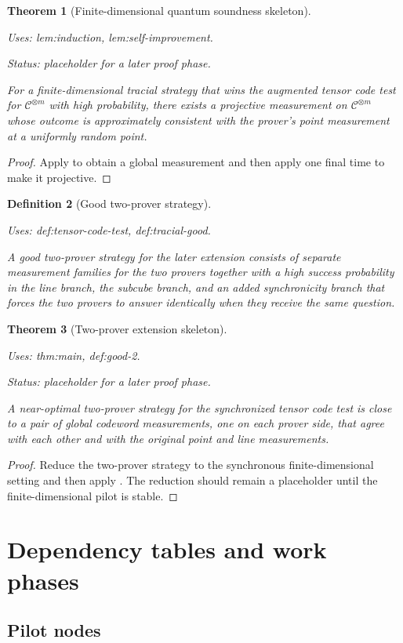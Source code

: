 \documentclass{article}
\providecommand{\uses}[1]{\par\smallskip\noindent\emph{Uses:} #1.\par\smallskip}
\providecommand{\notready}{\par\smallskip\noindent\emph{Status: placeholder for a later proof phase.}\par\smallskip}
\newtheorem{definition}{Definition}[section]
\newtheorem{theorem}[definition]{Theorem}
\theoremstyle{remark}
\newcommand{\code}{\mathcal{C}}
\begin{document}
\begin{theorem}[Finite-dimensional quantum soundness skeleton]\label{thm:main}
  \uses{lem:induction, lem:self-improvement}
  \notready
  For a finite-dimensional tracial strategy that wins the augmented tensor code test for $\code^{\otimes m}$ with high probability, there exists a projective measurement on $\code^{\otimes m}$ whose outcome is approximately consistent with the prover's point measurement at a uniformly random point.
\end{theorem}
\begin{proof}
  Apply  to obtain a global measurement and then apply  one final time to make it projective.
\end{proof}

\begin{definition}[Good two-prover strategy]\label{def:good-2}
  \uses{def:tensor-code-test, def:tracial-good}
  A good two-prover strategy for the later extension consists of separate measurement families for the two provers together with a high success probability in the line branch, the subcube branch, and an added synchronicity branch that forces the two provers to answer identically when they receive the same question.
\end{definition}

\begin{theorem}[Two-prover extension skeleton]\label{thm:main-bipartite}
  \uses{thm:main, def:good-2}
  \notready
  A near-optimal two-prover strategy for the synchronized tensor code test is close to a pair of global codeword measurements, one on each prover side, that agree with each other and with the original point and line measurements.
\end{theorem}
\begin{proof}
  Reduce the two-prover strategy to the synchronous finite-dimensional setting and then apply . The reduction should remain a placeholder until the finite-dimensional pilot is stable.
\end{proof}

\section{Dependency tables and work phases}\label{sec:tables}

\subsection{Pilot nodes}
\end{document}
